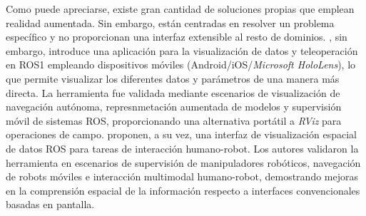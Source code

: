 Como puede apreciarse, existe gran cantidad de soluciones propias que emplean realidad 
aumentada. Sin embargo, están centradas en resolver un problema específico y no proporcionan una interfaz extensible al 
resto de dominios. 
\cite{ZEA2021100057}, sin embargo, introduce una aplicación para la visualización de datos y 
teleoperación en ROS1
empleando dispositivos móviles (Android/iOS/\textit{Microsoft HoloLens}), lo que 
permite visualizar los diferentes datos y parámetros de una manera más directa. La herramienta fue validada mediante escenarios 
de visualización de navegación autónoma, represnmetación aumentada de modelos y supervisión móvil de sistemas ROS, proporcionando 
una alternativa portátil a \textit{RViz} para operaciones de campo.
\cite{9701489} proponen, a su vez, una interfaz de visualización espacial de datos ROS para tareas de interacción humano-robot.
Los autores validaron la herramienta en escenarios de supervisión de manipuladores robóticos, navegación de robots móviles e interacción multimodal
humano-robot, demostrando mejoras en la comprensión espacial de la información respecto a interfaces convencionales basadas en pantalla.


